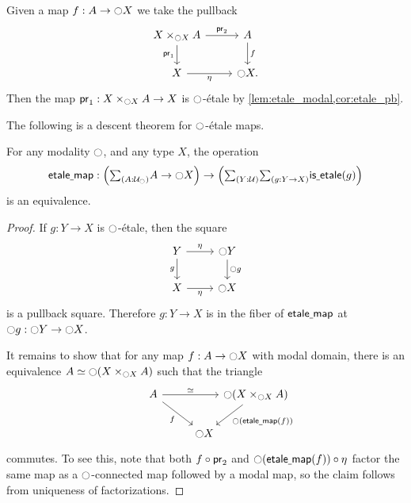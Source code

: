 \documentclass[9pt,twosided]{amsart}
\begin{document}
\begin{constr}
Given a map $f:A\to {\ensuremath{\ocircle}} X$ we take the pullback
\begin{equation*}
\begin{tikzcd}
X\times_{\modal X}A \arrow[d,swap,"\proj 1"] \arrow[r,"\proj 2"] & A \arrow[d,"f"] \\
X \arrow[r,swap,"\modalunit"] & \modal X.
\end{tikzcd}
\end{equation*}
Then the map $\mathsf{pr}_{1}:X\times_{{\ocircle} X}A\to X$ is ${\ocircle}$-\'etale by \cref{lem:etale_modal,cor:etale_pb}.
\end{constr}

The following is a descent theorem for ${\ocircle}$-\'etale maps.

\begin{thm}\label{thm:modal_descent}
For any modality ${\ocircle}$, and any type $X$, the operation
\begin{equation*}
\etmap:\Big(\sm{A:\UU_\modal}A\to\modal X\Big)\to\Big(\sm{Y:\UU}{g:Y\to X}\isetale(g)\Big)
\end{equation*}
is an equivalence.
\end{thm}

\begin{proof}
If $g:Y\to X$ is ${\ocircle}$-\'etale, then the square
\begin{equation*}
\begin{tikzcd}
Y \arrow[d,swap,"g"] \arrow[r,"\modalunit"] & \modal Y \arrow[d,"\modal g"] \\
X \arrow[r,swap,"\modalunit"] & \modal X
\end{tikzcd}
\end{equation*}
is a pullback square. Therefore $g:Y\to X$ is in the fiber of $\mathsf{etale\underline{\ }{}map}$ at ${\ocircle} g : {\ocircle} Y\to{\ensuremath{\ocircle}} X$. 

It remains to show that for any map $f:A\to{\ensuremath{\ocircle}} X$ with modal domain, there is an equivalence $\eqv{A}{\modal (X\times_{\modal X} A)}$ such that the triangle
\begin{equation*}
\begin{tikzcd}[column sep=0]
A \arrow[dr,swap,"f"] \arrow[rr,"\eqvsym"] & & \modal (X\times_{\modal X} A) \arrow[dl,"\modal(\etmap(f))"] \\
\phantom{\modal (X\times_{\modal X} A)} & \modal X
\end{tikzcd}
\end{equation*}
commutes. To see this, note that both $f\circ \mathsf{pr}_{2}$ and ${\ocircle}(\mathsf{etale\underline{\ }{}map}(f))\circ {\eta_{}}$ factor the same map as a ${\ocircle}$-connected map followed by a modal map, so the claim follows from uniqueness of factorizations.
\end{proof}
\end{document}
